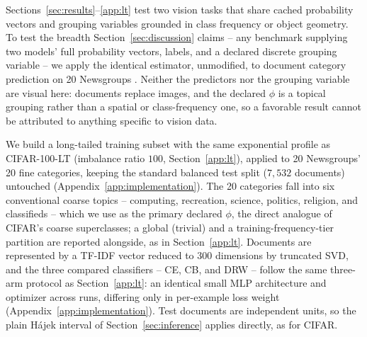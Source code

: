 Sections~\ref{sec:results}--\ref{app:lt} test two vision tasks that share cached
probability vectors and grouping variables grounded in class frequency or object geometry.
To test the breadth Section~\ref{sec:discussion} claims -- any benchmark supplying two
models' full probability vectors, labels, and a declared discrete grouping variable -- we
apply the identical estimator, unmodified, to document category prediction on 20
Newsgroups \citep{lang1995newsweeder}. Neither the predictors nor the grouping variable are
visual here: documents replace images, and the declared $\phi$ is a topical grouping
rather than a spatial or class-frequency one, so a favorable result cannot be attributed
to anything specific to vision data.

We build a long-tailed training subset with the same exponential profile as
CIFAR-100-LT (imbalance ratio $100$, Section~\ref{app:lt}), applied to 20
Newsgroups' 20 fine categories, keeping the standard balanced test split ($7{,}532$
documents) untouched (Appendix~\ref{app:implementation}). The 20 categories fall into
six conventional coarse topics -- computing, recreation, science, politics, religion,
and classifieds -- which we use as the primary declared $\phi$, the direct analogue of
CIFAR's coarse superclasses; a global (trivial) and a training-frequency-tier partition
are reported alongside, as in Section~\ref{app:lt}. Documents are represented by a
TF-IDF vector reduced to $300$ dimensions by truncated SVD, and the three compared
classifiers -- CE, CB, and DRW -- follow the same three-arm protocol as
Section~\ref{app:lt}: an identical small MLP architecture and optimizer across runs,
differing only in per-example loss weight (Appendix~\ref{app:implementation}). Test
documents are independent units, so the plain H\'ajek interval of Section~\ref{sec:inference}
applies directly, as for CIFAR.

